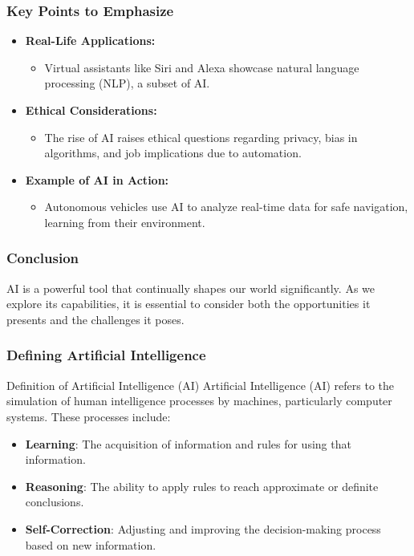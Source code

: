 \documentclass[aspectratio=169]{beamer}
\begin{document}
\begin{frame}[fragile]
    \frametitle{Key Points to Emphasize}
    \begin{itemize}
        \item \textbf{Real-Life Applications:} 
            \begin{itemize}
                \item Virtual assistants like Siri and Alexa showcase natural language processing (NLP), a subset of AI.
            \end{itemize}
        \item \textbf{Ethical Considerations:} 
            \begin{itemize}
                \item The rise of AI raises ethical questions regarding privacy, bias in algorithms, and job implications due to automation.
            \end{itemize}
        \item \textbf{Example of AI in Action:}
            \begin{itemize}
                \item Autonomous vehicles use AI to analyze real-time data for safe navigation, learning from their environment.
            \end{itemize}
    \end{itemize}
\end{frame}

\begin{frame}[fragile]
    \frametitle{Conclusion}
    AI is a powerful tool that continually shapes our world significantly. As we explore its capabilities, it is essential to consider both the opportunities it presents and the challenges it poses.
\end{frame}

\begin{frame}[fragile]
    \frametitle{Defining Artificial Intelligence}
    \begin{block}{Definition of Artificial Intelligence (AI)}
        Artificial Intelligence (AI) refers to the simulation of human intelligence processes by machines, particularly computer systems. These processes include:
    \end{block}
    \begin{itemize}
        \item \textbf{Learning}: The acquisition of information and rules for using that information.
        \item \textbf{Reasoning}: The ability to apply rules to reach approximate or definite conclusions.
        \item \textbf{Self-Correction}: Adjusting and improving the decision-making process based on new information.
    \end{itemize}
\end{frame}
\end{document}
